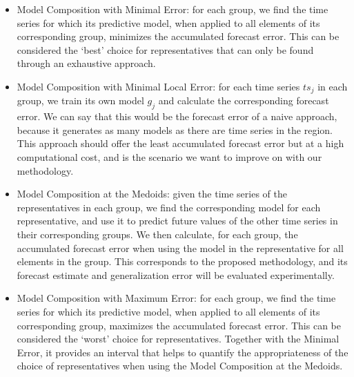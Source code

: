 \begin{itemize}%
	\item Model Composition with Minimal Error: for each group, we find the time series for which its predictive model, when applied to all elements of its corresponding group, minimizes the accumulated forecast error. This can be considered the `best' choice for representatives that can only be found through an exhaustive approach.
	\item Model Composition with Minimal Local Error: for each time series $ts_j$ in each group, we train its own model $g_j$ and calculate the corresponding forecast error. We can say that this would be the forecast error of a naive approach, because it generates as many models as there are time series in the region. This approach should offer the least accumulated forecast error but at a high computational cost, and is the scenario we want to improve on with our methodology.
	\item Model Composition at the Medoids: given the time series of the representatives in each group, we find the corresponding model for each representative, and use it to predict future values of the other time series in their corresponding groups. We then calculate, for each group, the accumulated forecast error when using the model in the representative for all elements in the group. This corresponds to the proposed methodology, and its forecast estimate and generalization error will be evaluated experimentally.
	\item Model Composition with Maximum Error: for each group, we find the time series for which its predictive model, when applied to all elements of its corresponding group, maximizes the accumulated forecast error. This can be considered the `worst' choice for representatives. Together with the Minimal Error, it provides an interval that helps to quantify the appropriateness of the choice of representatives when using the Model Composition at the Medoids.
\end{itemize}



